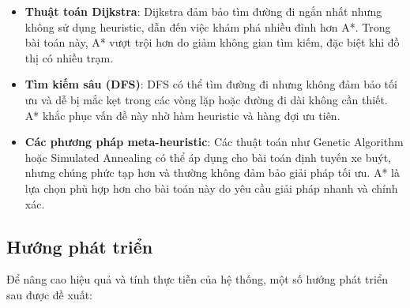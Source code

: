 \documentclass[a4paper,12pt]{article}
\begin{document}
\begin{itemize}
    \item \textbf{Thuật toán Dijkstra}: Dijkstra đảm bảo tìm đường đi ngắn nhất nhưng không sử dụng heuristic, dẫn đến việc khám phá nhiều đỉnh hơn A*. Trong bài toán này, A* vượt trội hơn do giảm không gian tìm kiếm, đặc biệt khi đồ thị có nhiều trạm.
    
    \item \textbf{Tìm kiếm sâu (DFS)}: DFS có thể tìm đường đi nhưng không đảm bảo tối ưu và dễ bị mắc kẹt trong các vòng lặp hoặc đường đi dài không cần thiết. A* khắc phục vấn đề này nhờ hàm heuristic và hàng đợi ưu tiên.
    
    \item \textbf{Các phương pháp meta-heuristic}: Các thuật toán như Genetic Algorithm hoặc Simulated Annealing có thể áp dụng cho bài toán định tuyến xe buýt, nhưng chúng phức tạp hơn và thường không đảm bảo giải pháp tối ưu. A* là lựa chọn phù hợp hơn cho bài toán này do yêu cầu giải pháp nhanh và chính xác.
\end{itemize}


\subsection{Hướng phát triển}

Để nâng cao hiệu quả và tính thực tiễn của hệ thống, một số hướng phát triển sau được đề xuất:
\end{document}
